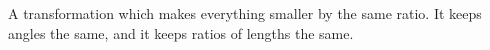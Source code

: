A transformation which makes everything smaller by
the same ratio. It keeps angles the same, and it
keeps ratios of lengths the same.
